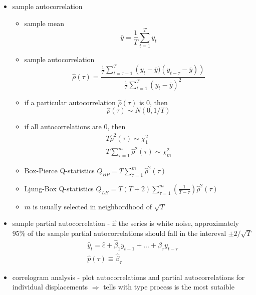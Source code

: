 \begin{itemize}
\begin{itemize}
\item sample autocorrelation
\begin{itemize}
\item sample mean
\begin{equation*}
\overline{y} = \frac{1}{T}\sum_{t = 1}^T y_t
\end{equation*}
\item sample autocorrelation
\begin{equation*}
\hat{\rho}(\tau) = \frac{\frac{1}{T}\sum_{t = \tau + 1}^T\left(y_t - \overline{y})(y_{t - \tau} - \overline{y})\right)}{\frac{1}{T}\sum_{t=1}^T(y_t - \overline{y})^2}
\end{equation*}
\item if a particular autocorrelation $\hat{\rho}(\tau)$ is 0, then
\begin{equation*}
\hat{\rho}(\tau) \sim N\left(0, 1/T \right)
\end{equation*}
\item if all autocorrelations are 0, then
\begin{gather*}
T\hat{\rho}^2(\tau) \sim \chi_1^2\\
T \sum_{\tau = 1}^m \hat{\rho}^2(\tau) \sim \chi_m^2
\end{gather*}
\item Box-Pierce Q-statistics $Q_{BP} = T \sum_{\tau = 1}^m \hat{\rho}^2(\tau)$
\item Ljung-Box Q-statistics $Q_{LB} = T (T + 2)\sum_{\tau = 1}^m \left(\frac{1}{T - \tau} \right)\hat{\rho}^2(\tau)$
\item $m$ is usually selected in neighbordhood of $\sqrt{T}$
\end{itemize}
\item sample partial autocorrelation - if the series is white noise, approximately 95\% of the sample partial autocorrelations should fall in the intereval $\pm 2 / \sqrt{T}$
\begin{gather*}
\hat{y}_t = \hat{c} + \hat{\beta}_1 y_{t - 1} + ... + \hat{\beta}_{\tau} y_{t - \tau}\\
\hat{p}(\tau) \equiv \hat{\beta}_{\tau}
\end{gather*}
\item correlogram analysis - plot autocorrelations and partial autocorrelations for individual displacements $\Rightarrow$ tells with type process is the most sutaible
\end{itemize}
\begin{figure}[htp]
\centering

\end{figure}
\end{itemize}
